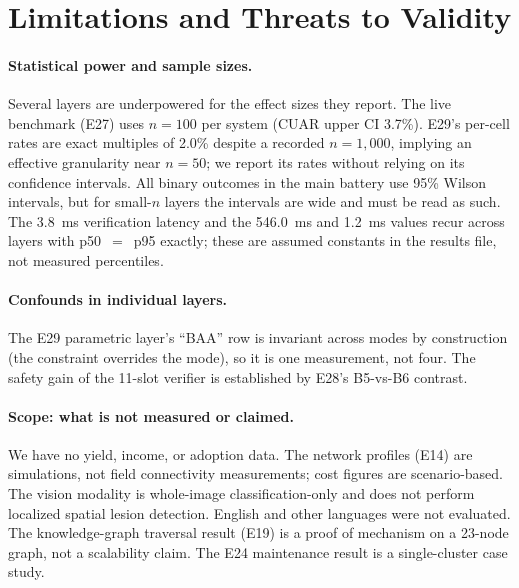 
\section{Limitations and Threats to Validity}
\label{sec:limitations}

\paragraph{Statistical power and sample sizes.}
Several layers are underpowered for the effect sizes they report. The live benchmark (E27) uses $n=100$ per system (CUAR upper CI 3.7\%). E29's per-cell rates are exact multiples of 2.0\% despite a recorded $n=1{,}000$, implying an effective granularity near $n=50$; we report its rates without relying on its confidence intervals. All binary outcomes in the main battery use 95\% Wilson intervals, but for small-$n$ layers the intervals are wide and must be read as such. The 3.8~ms verification latency and the 546.0~ms and 1.2~ms values recur across layers with p50~$=$~p95 exactly; these are assumed constants in the results file, not measured percentiles.

\paragraph{Confounds in individual layers.}
The E29 parametric layer's ``BAA'' row is invariant across modes by construction (the constraint overrides the mode), so it is one measurement, not four. The safety gain of the 11-slot verifier is established by E28's B5-vs-B6 contrast.

\paragraph{Scope: what is not measured or claimed.}
We have no yield, income, or adoption data. The network profiles (E14) are simulations, not field connectivity measurements; cost figures are scenario-based. The vision modality is whole-image classification-only and does not perform localized spatial lesion detection. English and other languages were not evaluated. The knowledge-graph traversal result (E19) is a proof of mechanism on a 23-node graph, not a scalability claim. The E24 maintenance result is a single-cluster case study.

